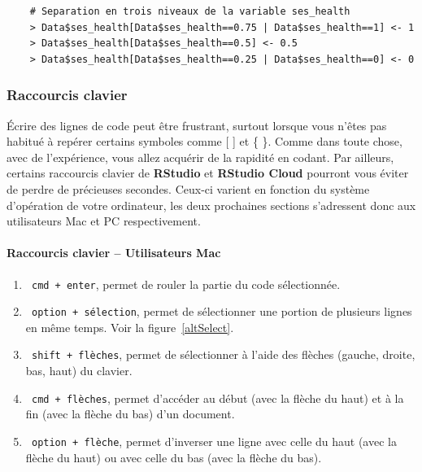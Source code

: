 \documentclass[10.5pt,a4paper]{article}
\newcommand{\rcode}[1]{\texttt{\color{rstudio} #1}}
\begin{document}
    \begin{lstlisting}
    # Separation en trois niveaux de la variable ses_health
    > Data$ses_health[Data$ses_health==0.75 | Data$ses_health==1] <- 1 
    > Data$ses_health[Data$ses_health==0.5] <- 0.5
    > Data$ses_health[Data$ses_health==0.25 | Data$ses_health==0] <- 0
    \end{lstlisting}
    
    \subsubsection{Raccourcis clavier}
    
   Écrire des lignes de code peut être frustrant, surtout lorsque vous n'êtes pas habitué à repérer certains symboles comme [ ] et \{ \}. Comme dans toute chose, avec de l'expérience, vous allez acquérir de la rapidité en codant. Par ailleurs, certains raccourcis clavier de \textbf{RStudio} et \textbf{RStudio Cloud} pourront vous éviter de perdre de précieuses secondes. Ceux-ci varient en fonction du système d'opération de votre ordinateur, les deux prochaines sections s'adressent donc aux utilisateurs Mac et PC respectivement. 
    
      \paragraph{Raccourcis clavier -- Utilisateurs Mac}
      \begin{enumerate}
        \item \rcode{cmd + enter}, permet de rouler la partie du code sélectionnée.
        \item \rcode{option + sélection}, permet de sélectionner une portion de plusieurs lignes en même temps. Voir la figure~\ref{altSelect}.
        \item \rcode{shift + flèches}, permet de sélectionner à l'aide des flèches (gauche, droite, bas, haut) du clavier.
        \item \rcode{cmd + flèches}, permet d'accéder au début (avec la flèche du haut) et à la fin (avec la flèche du bas) d'un document.
        \item \rcode{option + flèche}, permet d'inverser une ligne avec celle du haut (avec la flèche du haut) ou avec celle du bas (avec la flèche du bas).
      \end{enumerate}
      
\end{document}

